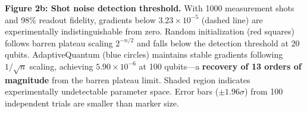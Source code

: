 
\textbf{Figure 2b: Shot noise detection threshold.} 
With 1000 measurement shots and 98\% readout fidelity, gradients below 
$3.23\times10^{-5}$ (dashed line) are experimentally indistinguishable from zero. 
Random initialization (red squares) follows barren plateau scaling $2^{-n/2}$ and 
falls below the detection threshold at 20 qubits. AdaptiveQuantum (blue circles) 
maintains stable gradients following $1/\sqrt{n}$ scaling, achieving 
$5.90\times10^{-6}$ at 100 qubits—a \textbf{recovery of 13 orders of magnitude} 
from the barren plateau limit. Shaded region indicates experimentally undetectable 
parameter space. Error bars ($\pm1.96\sigma$) from 100 independent trials are 
smaller than marker size.
